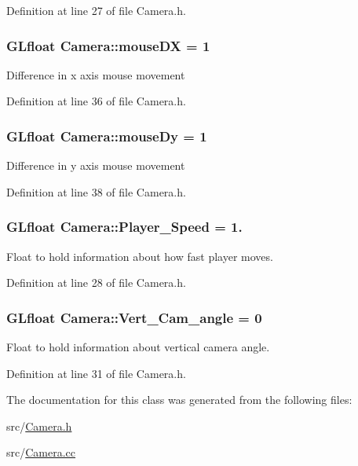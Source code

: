 Definition at line 27 of file Camera.\+h.

\hypertarget{class_camera_abc15ba4d62277f3f995127bb5d41517f}{}
\subsubsection[{mouse\+D\+X}]{\setlength{\rightskip}{0pt plus 5cm}G\+Lfloat Camera\+::mouse\+D\+X = 1}\label{class_camera_abc15ba4d62277f3f995127bb5d41517f}
Difference in x axis mouse movement 

Definition at line 36 of file Camera.\+h.

\hypertarget{class_camera_aeee67efd9e51edc7f3bc372c4d323753}{}
\subsubsection[{mouse\+Dy}]{\setlength{\rightskip}{0pt plus 5cm}G\+Lfloat Camera\+::mouse\+Dy = 1}\label{class_camera_aeee67efd9e51edc7f3bc372c4d323753}
Difference in y axis mouse movement 

Definition at line 38 of file Camera.\+h.

\hypertarget{class_camera_ab20174a89f86b685216dfe825e9ce95d}{}
\subsubsection[{Player\+\_\+\+Speed}]{\setlength{\rightskip}{0pt plus 5cm}G\+Lfloat Camera\+::\+Player\+\_\+\+Speed = 1.}\label{class_camera_ab20174a89f86b685216dfe825e9ce95d}
Float to hold information about how fast player moves. 

Definition at line 28 of file Camera.\+h.

\hypertarget{class_camera_a2b4d70e845ce688971b9ae32cf47dc45}{}
\subsubsection[{Vert\+\_\+\+Cam\+\_\+angle}]{\setlength{\rightskip}{0pt plus 5cm}G\+Lfloat Camera\+::\+Vert\+\_\+\+Cam\+\_\+angle = 0}\label{class_camera_a2b4d70e845ce688971b9ae32cf47dc45}
Float to hold information about vertical camera angle. 

Definition at line 31 of file Camera.\+h.



The documentation for this class was generated from the following files\+:\begin{DoxyCompactItemize}
\item 
src/\hyperlink{_camera_8h}{Camera.\+h}\item 
src/\hyperlink{_camera_8cc}{Camera.\+cc}\end{DoxyCompactItemize}
